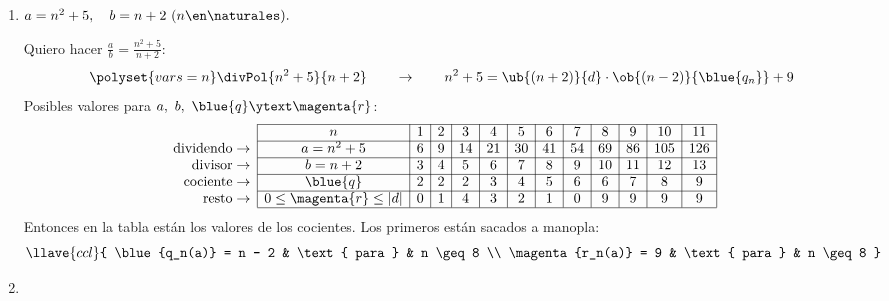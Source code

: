 \begin{enumerate}[label=\alph*)]
  \item $a = n^2 + 5,\quad b = n + 2 \ (n \en \naturales).$

        Quiero hacer $\frac{a}{b} = \frac{n^2 + 5}{n + 2}$:
        $$
          \polyset{vars=n}
          \divPol{n^2 + 5}{n + 2}
          \qquad \to \qquad
          n^2 + 5 = \ub{(n + 2)}{d} \cdot \ob{(n - 2)}{\blue{q_n}} + 9
        $$
        Posibles valores para $a,\ b,\ \blue{q} \ytext \magenta{r}$:
        $$
          \begin{array}{r|c|c|c|c|c|c|c|c|c|c|c|c|c|c} \cline{2-13}
                                & n                           & 1 & 2 & 3  & 4  & 5  & 6  & 7  & 8  & 9  & 10  & 11  \\ \cline{2-13}
            \text{dividendo}\to & a = n^2 + 5                 & 6 & 9 & 14 & 21 & 30 & 41 & 54 & 69 & 86 & 105 & 126 \\ \cline{2-13}
            \text{divisor}  \to & b = n + 2                   & 3 & 4 & 5  & 6  & 7  & 8  & 9  & 10 & 11 & 12  & 13  \\ \cline{2-13}
            \text{cociente} \to & \blue{q}                    & 2 & 2 & 2  & 3  & 4  & 5  & 6  & 6  & 7  & 8   & 9   \\ \cline{2-13}
            \text{resto}    \to & 0 \leq \magenta{r} \leq |d| & 0 & 1 & 4  & 3  & 2  & 1  & 0  & 9  & 9  & 9   & 9   \\ \cline{2-13}
          \end{array}
        $$
        Entonces en la tabla están los valores de los cocientes. Los primeros están sacados a manopla:
        $$
          \llave{ccl}{
            \blue{q_n(a)} = n - 2 & \text{ para } & n \geq 8 \\
            \magenta{r_n(a)} = 9 & \text{ para } & n \geq 8
          }
        $$

  \item \hacer
\end{enumerate}

\begin{aportes}
  \item {}
\end{aportes}
